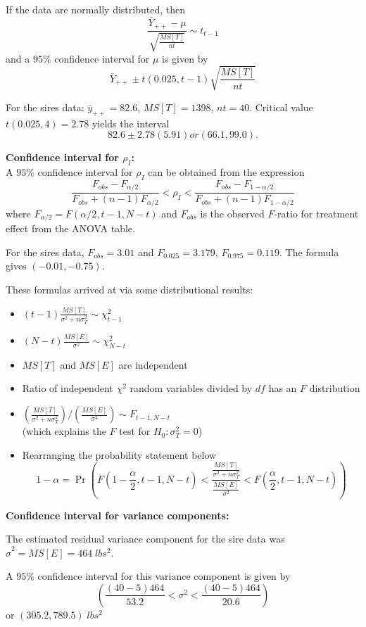 If the data are normally distributed, then
$$
\frac{\bar{Y}_{++} - \mu}{\sqrt{\frac{MS[T]}{nt}}} \sim t_{t-1}
$$
and a $95\%$ confidence interval for $\mu$ is given by
$$
\bar{Y}_{++} \pm t(0.025, t - 1) \sqrt{\frac{MS[T]}{nt}}
$$

For the sires data: $\bar{y}_{++} = 82.6$, $MS[T] = 1398$, $nt = 40$.  Critical value $t(0.025, 4) = 2.78$ yields the interval
$$
82.6 \pm 2.78(5.91) or (66.1, 99.0).
$$

{\bf Confidence interval for $\rho_I$:}\\
A $95\%$ confidence interval for $\rho_I$ can be obtained from the expression
$$
\frac{F_{{obs}} - F_{\alpha/2}}{F_{{obs}} + (n - 1) F_{\alpha/2}} < \rho_I < \frac{F_{{obs}} - F_{1- \alpha/2}}{F_{{obs}} + (n - 1) F_{1 - \alpha/2}}
$$
where $F_{\alpha/2} = F(\alpha / 2, t - 1, N - t)$ and $F_{{obs}}$ is the observed $F$-ratio for treatment effect from the ANOVA table.

For the sires data, $F_{obs} = 3.01$ and $F_{0.025} = 3.179$, $F_{0.975} = 0.119$.
The formula gives $(-0.01, -0.75)$.

These formulas arrived at via some distributional results:
\begin{itemize}
	\item $(t - 1)\frac{MS[T]}{\sigma^2 + n \sigma_T^2} \sim \chi_{t - 1}^2$
	\item $(N - t)\frac{MS[E]}{\sigma^2 } \sim \chi_{N - t}^2$
	\item $MS[T]$ and $MS[E]$ are independent
	\item Ratio of independent $\chi^2$ random variables divided by $df$ has an $F$ distribution
	\item $\left(\frac{MS[T]}{\sigma^2 + n\sigma_T^2}\right) / \left(\frac{MS[E]}{\sigma^2}\right) \sim F_{t-1, N-t}$ \\
	(which explains the $F$ test for $H_0: \sigma^2_T = 0$)
	\item Rearranging the probability statement below
	$$
	1 - \alpha = \Pr \left(F(1 - \frac{\alpha}{2}, t - 1, N - t) < \frac{\frac{MS[T]}{\sigma^2 + n\sigma^2_T}}{\frac{MS[E]}{\sigma^2}} < F( \frac{\alpha}{2}, t - 1, N - t)\right)
	$$
\end{itemize}


{\bf Confidence interval for variance components:}

The estimated residual variance component for the sire data was
$\hat{\sigma}^2 = MS[E] = 464 \; lbs^2$.

A $95\%$ confidence interval for this variance component is given by
$$
\left( \frac{(40-5)464}{53.2} < \sigma^2 < \frac{(40 - 5)464}{20.6} \right)
$$
or $(305.2, 789.5) \; lbs^2$

